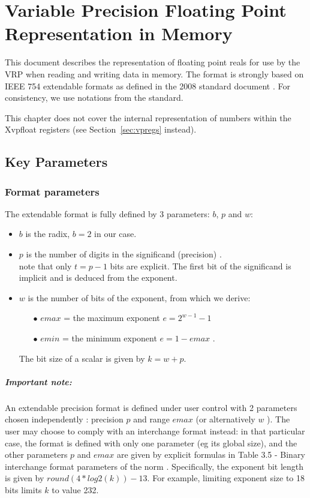 \chapter{Variable Precision Floating Point Representation in Memory}
\label{sec:mem_format}

This document describes the representation of floating point reals for use by the VRP when reading and writing data in memory.
The format is strongly based on IEEE 754 extendable formats as defined in the 2008 standard document \cite{IEEE754}.
For consistency, we use notations from the standard.

This chapter does not cover the internal representation of numbers within the Xvpfloat registers (see Section~\ref{sec:vpregs} instead).

\section{Key Parameters}

\subsection{Format parameters}
The extendable format is fully defined by 3 parameters: $b$, $p$ and $w$:
\begin{itemize}[topsep=0pt]
\item $b$ is the radix, $b=2$ in our case.
\item $p$ is the number of digits in the significand (precision) . \\
  note that only $t=p-1$ bits are explicit. The first bit of the significand is implicit and is deduced from the exponent.
\item $w$ is the number of bits of the exponent, from which we derive:
  \begin{itemize}[topsep=0pt]
  \item[$\bullet$]  $emax$ = the maximum exponent $e=2^{{w-1}}-1$
  \item[$\bullet$]  $emin$ = the minimum exponent $e=1-emax$ .
  \end{itemize}
The bit size of a scalar is given by $k=w+p$.
\end{itemize}

\paragraph{Important note:} An extendable precision format is defined under user control with 2 parameters chosen independently : precision $p$ and range $emax$ (or alternatively $w$ ).
The user may choose to comply with an interchange format instead: in that particular case, the format is defined with only one parameter (eg its global size), and the other parameters $p$ and $emax$ are given by explicit formulas in Table 3.5 - Binary interchange format parameters of the norm \cite{IEEE754}.
Specifically, the exponent bit length is given by $round(4*log2(k))-13$. 
For example, limiting exponent size to 18 bits limits $k$ to value 232.

